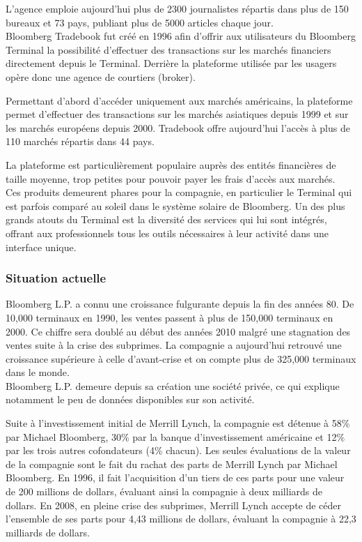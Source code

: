 \documentclass[11pt, oneside, titlepage, a4paper]{article}
\begin{document}
L'agence emploie aujourd'hui plus de 2300 journalistes répartis dans plus de 150 bureaux et 73 pays, publiant plus de 5000 articles chaque jour.
\\

Bloomberg Tradebook fut créé en 1996 afin d'offrir aux utilisateurs du Bloomberg Terminal la possibilité d'effectuer des transactions sur les marchés financiers directement depuis le Terminal. Derrière la plateforme utilisée par les usagers opère donc une agence de courtiers (broker).

Permettant d'abord d'accéder uniquement aux marchés américains, la plateforme permet d'effectuer des transactions sur les marchés asiatiques depuis 1999 et sur les marchés européens depuis 2000. Tradebook offre aujourd'hui l'accès à plus de 110 marchés répartis dans 44 pays.

La plateforme est particulièrement populaire auprès des entités financières de taille moyenne, trop petites pour pouvoir payer les frais d'accès aux marchés.
\\

Ces produits demeurent phares pour la compagnie, en particulier le Terminal qui est parfois comparé au soleil dans le système solaire de Bloomberg. Un des plus grands atouts du Terminal est la diversité des services qui lui sont intégrés, offrant aux professionnels tous les outils nécessaires à leur activité dans une interface unique.
		\subsubsection{Situation actuelle}
Bloomberg L.P. a connu une croissance fulgurante depuis la fin des années 80. De 10,000 terminaux en 1990, les ventes passent à plus de 150,000 terminaux en 2000. Ce chiffre sera doublé au début des années 2010 malgré une stagnation des ventes suite à la crise des subprimes. La compagnie a aujourd'hui retrouvé une croissance supérieure à celle d'avant-crise et on compte plus de 325,000 terminaux dans le monde.
\\

Bloomberg L.P. demeure depuis sa création une société privée, ce qui explique notamment le peu de données disponibles sur son activité.

Suite à l'investissement initial de Merrill Lynch, la compagnie est détenue à 58\% par Michael Bloomberg, 30\% par la banque d'investissement américaine et 12\% par les trois autres cofondateurs (4\% chacun). Les seules évaluations de la valeur de la compagnie sont le fait du rachat des parts de Merrill Lynch par Michael Bloomberg. En 1996, il fait l'acquisition d'un tiers de ces parts pour une valeur de 200 millions de dollars, évaluant ainsi la compagnie à deux milliards de dollars. En 2008, en pleine crise des subprimes, Merrill Lynch accepte de céder l'ensemble de ses parts pour 4,43 millions de dollars, évaluant la compagnie à 22,3 milliards de dollars.
\end{document}
